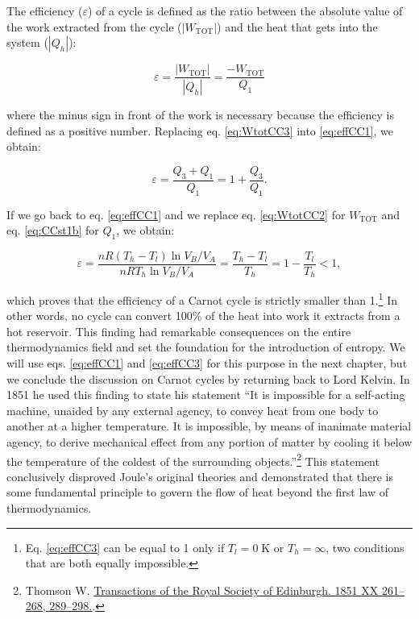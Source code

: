 \documentclass[
  9pt,
]{extbook}
\theoremstyle{definition}
\theoremstyle{definition}
\theoremstyle{definition}
\theoremstyle{remark}
\begin{document}
The efficiency (\(\varepsilon\)) of a cycle is defined as the ratio between the absolute value of the work extracted from the cycle (\(\left| W_{\text{TOT}} \right|\)) and the heat that gets into the system (\(\left| Q_h \right|\)):

\begin{equation}
\varepsilon = \frac{\left| W_{\text{TOT}} \right|}{\left| Q_h \right|} =\frac{-W_{\text{TOT}}}{Q_1}
\label{eq:effCC1}
\end{equation}

where the minus sign in front of the work is necessary because the efficiency is defined as a positive number. Replacing eq. \eqref{eq:WtotCC3} into \eqref{eq:effCC1}, we obtain:

\begin{equation}
\varepsilon = \frac{Q_3+Q_1}{Q_1} = 1+\frac{Q_3}{Q_1}.
\label{eq:effCC2}
\end{equation}

If we go back to eq. \eqref{eq:effCC1} and we replace eq. \eqref{eq:WtotCC2} for \(W_{\mathrm{TOT}}\) and eq. \eqref{eq:CCst1b} for \(Q_1\), we obtain:

\begin{equation}
\varepsilon = \frac{nR \left( T_h - T_l \right) \ln V_B/V_A}{nRT_h \ln V_B/V_A} = \frac{T_h-T_l}{T_h}=1-\frac{T_l}{T_h }<1,
\label{eq:effCC3}
\end{equation}

which proves that the efficiency of a Carnot cycle is strictly smaller than 1.\footnote{Eq. \eqref{eq:effCC3} can be equal to 1 only if \(T_l=0 \; \text{K}\) or \(T_h=\infty\), two conditions that are both equally impossible.} In other words, no cycle can convert 100\% of the heat into work it extracts from a hot reservoir. This finding had remarkable consequences on the entire thermodynamics field and set the foundation for the introduction of entropy. We will use eqs. \eqref{eq:effCC1} and \eqref{eq:effCC3} for this purpose in the next chapter, but we conclude the discussion on Carnot cycles by returning back to Lord Kelvin. In 1851 he used this finding to state his statement ``It is impossible for a self-acting machine, unaided by any external agency, to convey heat from one body to another at a higher temperature. It is impossible, by means of inanimate material agency, to derive mechanical effect from any portion of matter by cooling it below the temperature of the coldest of the surrounding objects.''\footnote{Thomson W. \href{https://www.biodiversitylibrary.org/item/126047\#page/295/mode/1up}{Transactions of the Royal Society of Edinburgh. 1851 XX 261--268, 289--298.}.} This statement conclusively disproved Joule's original theories and demonstrated that there is some fundamental principle to govern the flow of heat beyond the first law of thermodynamics.
\end{document}
